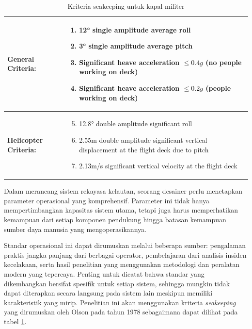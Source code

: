 \begin{table}[htbp]
    \centering
    \caption{Kriteria seakeeping untuk kapal militer \citep{olson1978evaluation}}
    \label{tabel-kriteria-seakeeping}
    \begin{tabular}{|p{}|p{}|}
        \hline
        \textbf{General Criteria:} & \begin{enumerate}
            \item 12° single amplitude average roll
            \item 3° single amplitude average pitch
            \item Significant heave acceleration $\leq 0.4g$ (no people working on deck)
            \item Significant heave acceleration $\leq 0.2g$ (people working on deck)
        \end{enumerate} \\
        \hline
        \textbf{Helicopter Criteria:} & \begin{enumerate}
            \setcounter{enumi}{4} %
            \item 12.8° double amplitude significant roll
            \item 2.55m double amplitude significant vertical displacement at the flight deck due to pitch
            \item 2.13m/s significant vertical velocity at the flight deck
        \end{enumerate} \\
        \hline
    \end{tabular}
\end{table}

Dalam merancang sistem rekayasa kelautan, seorang desainer perlu menetapkan parameter operasional yang komprehensif. Parameter ini tidak hanya mempertimbangkan kapasitas sistem utama, tetapi juga harus memperhatikan kemampuan dari setiap komponen pendukung hingga batasan kemampuan sumber daya manusia yang mengoperasikannya.

Standar operasional ini dapat dirumuskan melalui beberapa sumber: pengalaman praktis jangka panjang dari berbagai operator, pembelajaran dari analisis insiden kecelakaan, serta hasil penelitian yang menggunakan metodologi dan peralatan modern yang tepercaya. Penting untuk dicatat bahwa standar yang dikembangkan bersifat spesifik untuk setiap sistem, sehingga mungkin tidak dapat diterapkan secara langsung pada sistem lain meskipun memiliki karakteristik yang mirip. Penelitian ini akan menggunakan kriteria \emph{seakeeping} yang dirumuskan oleh Olson pada tahun 1978 sebagaimana dapat dilihat pada tabel \ref{tabel-kriteria-seakeeping}. 